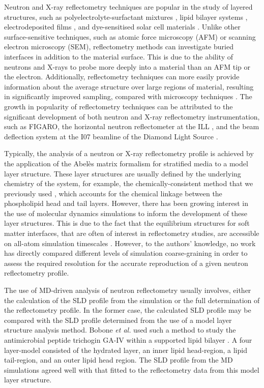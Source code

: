 \documentclass[amsmath,amssymb,twocolumn,superscriptaddress]{revtex4-1}
\begin{document}
Neutron and X-ray reflectometry techniques are popular in the study of layered structures, such as polyelectrolyte-surfactant mixtures \cite{llamas_study_2018}, lipid bilayer systems \cite{waldie_localization_2018}, electrodeposited films \cite{beebee_effect_2019}, and dye-sensitised solar cell materials \cite{mccree-grey_preferred_2015}.
Unlike other surface-sensitive techniques, such as atomic force microscopy (AFM) or scanning electron microscopy (SEM), reflectometry methods can investigate buried interfaces in addition to the material surface.
This is due to the ability of neutrons and X-rays to probe more deeply into a material than an AFM tip or the electron.
Additionally, reflectometry techniques can more easily provide information about the average structure over large regions of material, resulting in significantly improved sampling, compared with microscopy techniques \cite{renaud_probing_2009}.
The growth in popularity of reflectometry techniques can be attributed to the significant development of both neutron and X-ray reflectometry instrumentation, such as FIGARO, the horizontal neutron reflectometer at the ILL \cite{campbell_figaro_2011}, and the beam deflection system at the I07 beamline of the Diamond Light Source \cite{arnold_implementation_2012}.

Typically, the analysis of a neutron or X-ray reflectometry profile is achieved by the application of the Abel\`{e}s matrix formalism for stratified media \cite{abeles_sur_1948,parratt_surface_1954} to a model layer structure.
These layer structures are usually defined by the underlying chemistry of the system, for example, the chemically-consistent method that we previously used \cite{mccluskey_bayesian_2019}, which accounts for the chemical linkage between the phospholipid head and tail layers.
However, there has been growing interest in the use of molecular dynamics simulations to inform the development of these layer structures.
This is due to the fact that the equilibrium structures for soft matter interfaces, that are often of interest in reflectometry studies, are accessible on all-atom simulation timescales \cite{scoppola_combining_2018}.
However, to the authors' knowledge, no work has directly compared different levels of simulation coarse-graining in order to assess the required resolution for the accurate reproduction of a given neutron reflectometry profile.

The use of MD-driven analysis of neutron reflectometry usually involves, either the calculation of the SLD profile from the simulation or the full determination of the reflectometry profile.
In the former case, the calculated SLD profile may be compared with the SLD profile determined from the use of a model layer structure analysis method.
Bobone \emph{et al.} used such a method to study the antimicrobial peptide trichogin GA-IV within a supported lipid bilayer \cite{bobone_membrane_2013}.
A four layer-model consisted of the hydrated  layer, an inner lipid head-region, a lipid tail-region, and an outer lipid head region.
The SLD profile from the MD simulations agreed well with that fitted to the reflectometry data from this model layer structure.
\end{document}
